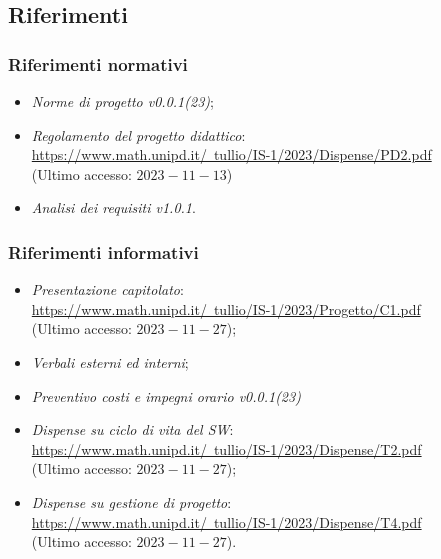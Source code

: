 \documentclass[10pt, a4paper]{article}
\begin{document}
\subsection{Riferimenti}

\subsubsection{Riferimenti normativi} 
\begin{itemize}
\item \textit{Norme di progetto v0.0.1(23)};
\item \textit{Regolamento del progetto didattico}: \\
\href{https://www.math.unipd.it/~tullio/IS-1/2023/Dispense/PD2.pdf}{https://www.math.unipd.it/~tullio/IS-1/2023/Dispense/PD2.pdf}\\
(Ultimo accesso: $2023-11-13$)

\item \textit{Analisi dei requisiti v1.0.1}.
\end{itemize}

\subsubsection{Riferimenti informativi}
\begin{itemize}
   
    \item \textit{Presentazione capitolato}:\\
    \href{https://www.math.unipd.it/~tullio/IS-1/2023/Progetto/C1.pdf}{https://www.math.unipd.it/~tullio/IS-1/2023/Progetto/C1.pdf}\\
    (Ultimo accesso: $2023-11-27$);   
    
    \item \textit{Verbali esterni ed interni};
    \item \textit{Preventivo costi e impegni orario v0.0.1(23)}
    
    \item \textit{Dispense su ciclo di vita del SW}:\\
    \href{https://www.math.unipd.it/~tullio/IS-1/2023/Dispense/T2.pdf}{https://www.math.unipd.it/~tullio/IS-1/2023/Dispense/T2.pdf}\\
    (Ultimo accesso: $2023-11-27$);
    
    \item  \textit{Dispense su gestione di progetto}:\\
    \href{https://www.math.unipd.it/~tullio/IS-1/2023/Dispense/T4.pdf}{https://www.math.unipd.it/~tullio/IS-1/2023/Dispense/T4.pdf}\\
    (Ultimo accesso: $2023-11-27$).
\end{itemize}
\end{document}
